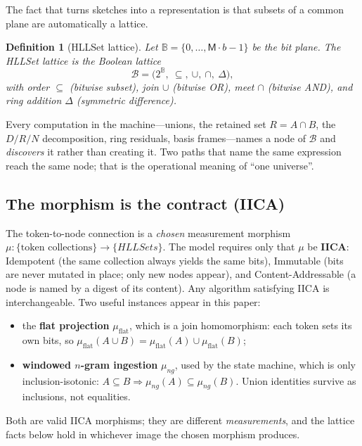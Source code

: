 \documentclass[11pt,a4paper]{article}
\newtheorem{definition}[principle]{Definition}
\theoremstyle{remark}
\newcommand{\Plane}{\ensuremath{\mathbb{B}}}          %
\newcommand{\Lat}{\ensuremath{\mathcal{B}}}           %
\newcommand{\xor}{\ensuremath{\Delta}}                %
\newcommand{\Reg}{\ensuremath{\mathsf{M}}}            %
\newcommand{\Bits}{\ensuremath{b}}                    %
\begin{document}
The fact that turns sketches into a representation is that subsets of a common
plane are automatically a lattice.

\begin{definition}[HLLSet lattice]
\label{def:lattice}
Let $\Plane=\{0,\dots,\Reg\cdot\Bits-1\}$ be the bit plane. The HLLSet lattice is
the Boolean lattice
\[
\Lat = \bigl(2^{\Plane},\ \subseteq,\ \cup,\ \cap,\ \xor\bigr),
\]
with order $\subseteq$ (bitwise subset), join $\cup$ (bitwise OR), meet $\cap$
(bitwise AND), and ring addition $\xor$ (symmetric difference).
\end{definition}

Every computation in the machine---unions, the retained set $R=A\cap B$, the
$D/R/N$ decomposition, ring residuals, basis frames---names a node of $\Lat$ and
\emph{discovers} it rather than creating it. Two paths that name the same
expression reach the same node; that is the operational meaning of ``one
universe''.

\subsection{The morphism is the contract (IICA)}

The token-to-node connection is a \emph{chosen} measurement morphism
$\mu:\{\text{token collections}\}\to\{HLLSets\}$. The model requires only that
$\mu$ be \textbf{IICA}: Idempotent (the same collection always yields the same
bits), Immutable (bits are never mutated in place; only new nodes appear), and
Content-Addressable (a node is named by a digest of its content). Any algorithm
satisfying IICA is interchangeable. Two useful instances appear in this paper:

\begin{itemize}[leftmargin=*,nosep]
  \item the \textbf{flat projection} $\mu_{\mathrm{flat}}$, which is a join
    homomorphism: each token sets its own bits, so
    $\mu_{\mathrm{flat}}(A\cup B)=\mu_{\mathrm{flat}}(A)\cup\mu_{\mathrm{flat}}(B)$;
  \item \textbf{windowed $n$-gram ingestion} $\mu_{ng}$, used by the state
    machine, which is only inclusion-isotonic:
    $A\subseteq B \Rightarrow \mu_{ng}(A)\subseteq \mu_{ng}(B)$. Union
    identities survive as inclusions, not equalities.
\end{itemize}

Both are valid IICA morphisms; they are different \emph{measurements}, and the
lattice facts below hold in whichever image the chosen morphism produces.
\end{document}
